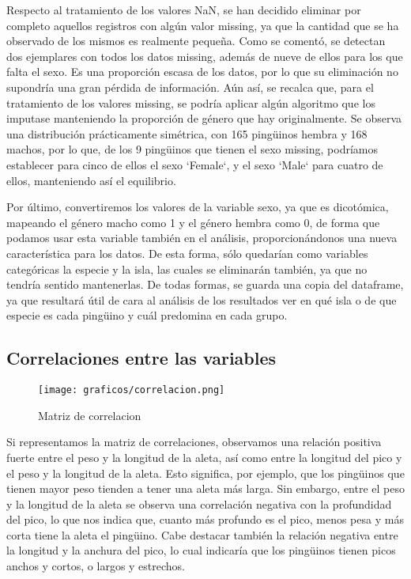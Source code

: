 \documentclass[a4paper,onecolumn]{extarticle}
\begin{document}
\begin{sloppypar}
Respecto al tratamiento de los valores NaN, se han decidido eliminar por completo aquellos registros con algún valor missing, ya que la cantidad que se ha 
observado de los mismos es realmente pequeña. Como se comentó, se detectan dos ejemplares con todos los datos missing, además de nueve de ellos para los que 
falta el sexo. Es una proporción escasa de los datos, por lo que su eliminación no supondría una gran pérdida de información. Aún así, se recalca que, para 
el tratamiento de los valores missing, se podría aplicar algún algoritmo que los imputase manteniendo la proporción de género que hay originalmente. Se observa 
una distribución prácticamente simétrica, con 165 pingüinos hembra y 168 machos, por lo que, de los 9 pingüinos que tienen el sexo missing, podríamos establecer 
para cinco de ellos el sexo `Female`, y el sexo `Male` para cuatro de ellos, manteniendo así el equilibrio.

Por último, convertiremos los valores de la variable sexo, ya que es dicotómica, mapeando el género macho como 1 y el género hembra como 0, de forma que 
podamos usar esta variable también en el análisis, proporcionándonos una nueva característica para los datos. De esta forma, sólo quedarían como variables 
categóricas la especie y la isla, las cuales se eliminarán también, ya que no tendría sentido mantenerlas. De todas formas, se guarda una copia del dataframe, 
ya que resultará útil de cara al análisis de los resultados ver en qué isla o de que especie es cada pingüino y cuál predomina en cada grupo.

\subsection{Correlaciones entre las variables}\label{correlaciones}
\begin{wrapfigure}[15]{l}{7cm}
    \texttt{[image: graficos/correlacion.png]}
    \small{\caption{Matriz de correlacion}}
    \label{correlacion}
\end{wrapfigure} 
Si representamos la matriz de correlaciones, observamos una relación positiva fuerte entre el peso y la longitud de la aleta, así como entre la longitud del 
pico y el peso y la longitud de la aleta. Esto significa, por ejemplo, que los pingüinos que tienen mayor peso tienden a tener una aleta más larga. Sin embargo, 
entre el peso y la longitud de la aleta se observa una correlación negativa con la profundidad del pico, lo que nos indica que, cuanto más profundo es el pico, 
menos pesa y más corta tiene la aleta el pingüino. Cabe destacar también la relación negativa entre la longitud y la anchura del pico, lo cual indicaría que 
los pingüinos tienen picos anchos y cortos, o largos y estrechos.


\end{sloppypar}
\end{document}
